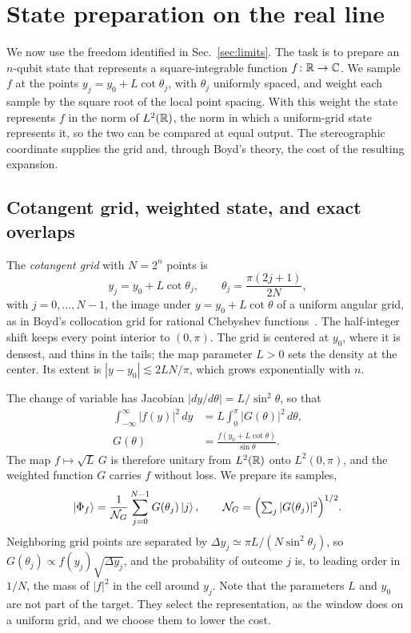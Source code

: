 \section{State preparation on the real line}
\label{sec:stateprep}

We now use the freedom identified in Sec.~\ref{sec:limits}.  The
task is to prepare an $n$-qubit state that represents a
square-integrable function $f\colon\mathbb{R}\to\mathbb{C}$.  We sample $f$ at the
points $y_j=y_0+L\cot\theta_j$, with $\theta_j$ uniformly spaced,
and weight each sample by the square root of the local point
spacing.  With this weight the state represents $f$ in the norm of
$L^2(\mathbb{R})$, the norm in which a uniform-grid state represents it,
so the two can be compared at equal output.  The stereographic
coordinate supplies the grid and, through Boyd's theory, the cost
of the resulting expansion.

\subsection{Cotangent grid, weighted state, and exact overlaps}
\label{subsec:grid}

The \emph{cotangent grid} with $N=2^n$ points is
\begin{equation}
	y_j=y_0+L\cot\theta_j,\qquad \theta_j=\frac{\pi(2j+1)}{2N},
	\label{eq:cot-grid}
\end{equation}
with $j=0,\dots,N-1$, the image under $y=y_0+L\cot\theta$ of a
uniform angular grid, as
in Boyd's collocation grid for rational Chebyshev
functions~\cite[Sec.~17.7]{Boyd2001}.  The half-integer shift keeps
every point interior to $(0,\pi)$.  The grid is centered at $y_0$,
where it is densest, and thins in the tails; the map parameter
$L>0$ sets the density at the center.  Its extent is
$|y-y_0|\lesssim 2LN/\pi$, which grows exponentially with $n$.

The change of variable has Jacobian $|dy/d\theta|=L/\sin^2\theta$,
so that
\begin{equation}
	\begin{split}
		\int_{-\infty}^{\infty}|f(y)|^2\,dy
		&=L\int_0^\pi|G(\theta)|^2\,d\theta,\\
		G(\theta)&=\frac{f(y_0+L\cot\theta)}{\sin\theta}.
	\end{split}
	\label{eq:weighted}
\end{equation}
The map $f\mapsto\sqrt{L}\,G$ is therefore unitary from $L^2(\mathbb{R})$
onto $L^2(0,\pi)$, and the weighted function $G$ carries $f$
without loss.  We prepare its samples,
\begin{equation}
	\ket{\Phi_f}=\frac{1}{\mathcal{N}_G}\sum_{j=0}^{N-1}
	G(\theta_j)\ket{j},
	\qquad \mathcal{N}_G=\Bigl(\textstyle\sum_j|G(\theta_j)|^2\Bigr)^{1/2}.
	\label{eq:target-state}
\end{equation}
Neighboring grid points are separated by
$\Delta y_j\simeq\pi L/(N\sin^2\theta_j)$, so
$G(\theta_j)\propto f(y_j)\sqrt{\Delta y_j}$, and the probability of
outcome $j$ is, to leading order in $1/N$, the mass of $|f|^2$ in
the cell around $y_j$.  Note that the
parameters $L$ and $y_0$ are not part of the target.  They select
the representation, as the window does on a uniform grid, and we
choose them to lower the cost.

